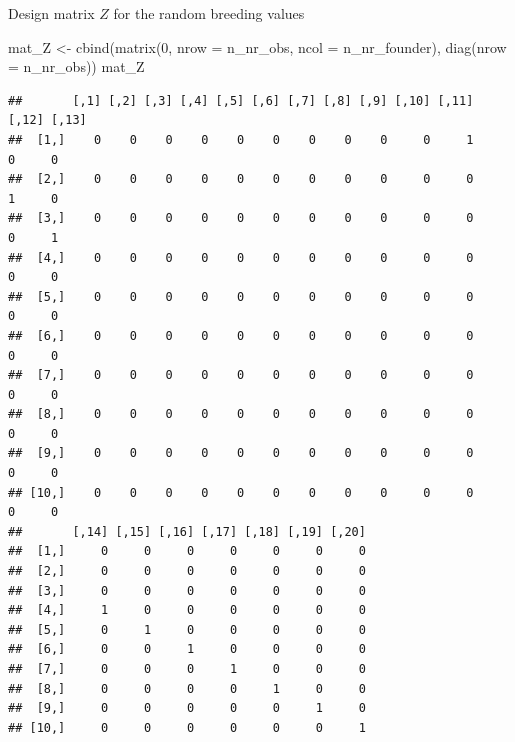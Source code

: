 \documentclass[
]{article}
\newenvironment{Shaded}{\begin{snugshade}}{\end{snugshade}}
\newcommand{\AttributeTok}[1]{\textcolor[rgb]{0.77,0.63,0.00}{#1}}
\newcommand{\DecValTok}[1]{\textcolor[rgb]{0.00,0.00,0.81}{#1}}
\newcommand{\FunctionTok}[1]{\textcolor[rgb]{0.00,0.00,0.00}{#1}}
\newcommand{\NormalTok}[1]{#1}
\newcommand{\OtherTok}[1]{\textcolor[rgb]{0.56,0.35,0.01}{#1}}
\newcommand{\SpecialCharTok}[1]{\textcolor[rgb]{0.00,0.00,0.00}{#1}}
\begin{document}
\begin{Shaded}
\end{Shaded}

Design matrix \(Z\) for the random breeding values

\begin{Shaded}
\begin{Highlighting}[]
\NormalTok{mat\_Z }\OtherTok{\textless{}{-}} \FunctionTok{cbind}\NormalTok{(}\FunctionTok{matrix}\NormalTok{(}\DecValTok{0}\NormalTok{, }\AttributeTok{nrow =}\NormalTok{ n\_nr\_obs, }\AttributeTok{ncol =}\NormalTok{ n\_nr\_founder), }\FunctionTok{diag}\NormalTok{(}\AttributeTok{nrow =}\NormalTok{ n\_nr\_obs))}
\NormalTok{mat\_Z}
\end{Highlighting}
\end{Shaded}

\begin{verbatim}
##       [,1] [,2] [,3] [,4] [,5] [,6] [,7] [,8] [,9] [,10] [,11] [,12] [,13]
##  [1,]    0    0    0    0    0    0    0    0    0     0     1     0     0
##  [2,]    0    0    0    0    0    0    0    0    0     0     0     1     0
##  [3,]    0    0    0    0    0    0    0    0    0     0     0     0     1
##  [4,]    0    0    0    0    0    0    0    0    0     0     0     0     0
##  [5,]    0    0    0    0    0    0    0    0    0     0     0     0     0
##  [6,]    0    0    0    0    0    0    0    0    0     0     0     0     0
##  [7,]    0    0    0    0    0    0    0    0    0     0     0     0     0
##  [8,]    0    0    0    0    0    0    0    0    0     0     0     0     0
##  [9,]    0    0    0    0    0    0    0    0    0     0     0     0     0
## [10,]    0    0    0    0    0    0    0    0    0     0     0     0     0
##       [,14] [,15] [,16] [,17] [,18] [,19] [,20]
##  [1,]     0     0     0     0     0     0     0
##  [2,]     0     0     0     0     0     0     0
##  [3,]     0     0     0     0     0     0     0
##  [4,]     1     0     0     0     0     0     0
##  [5,]     0     1     0     0     0     0     0
##  [6,]     0     0     1     0     0     0     0
##  [7,]     0     0     0     1     0     0     0
##  [8,]     0     0     0     0     1     0     0
##  [9,]     0     0     0     0     0     1     0
## [10,]     0     0     0     0     0     0     1
\end{verbatim}
\end{document}
